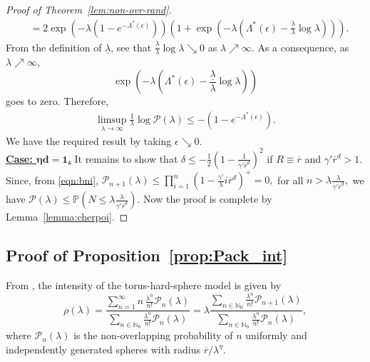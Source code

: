 \documentclass[11pt]{article}
\newcommand{\pp}{\mathbb{P}}
\newcommand{\rbdd}{\overline{r}}
\newcommand{\mbb}{\mathbb}
\newcommand{\lt}{\left}
\newcommand{\rt}{\right}
\newcommand{\pno}{\mathcal{P}(\lambda)}
\begin{document}
\begin{appendices}
\begin{proof}[Proof of Theorem~\ref{lem:non-ovr-rand}]
\begin{align*}
     &= 2\exp\lt(- \lambda\lt(1 - e^{-\Lambda^*(\epsilon)} \rt) \rt) \lt( 1 + \exp\lt(- \lambda\lt(\Lambda^*(\epsilon) - \frac{\underline{\lambda}}{\lambda} \log\lambda\rt)\rt)\rt).
\end{align*}
From the definition of $\underline{\lambda}$, see that $\frac{\underline{\lambda}}{\lambda} \log\lambda \searrow 0$ as $\lambda \nearrow \infty$. As a consequence, as $\lambda \nearrow \infty$, $$\exp\lt(- \lambda\lt(\Lambda^*(\epsilon) - \frac{\underline{\lambda}}{\lambda} \log\lambda\rt)\rt)$$ goes to zero.
Therefore,
\begin{align*}
\limsup_{\lambda \rightarrow \infty} \frac{1}{\lambda} \log \pno \leq -\lt(1 - e^{-\Lambda^*(\epsilon)} \rt).
\end{align*}
We have the required result by taking $\epsilon \searrow 0$.\\




{\bf \underline{Case: $\boldsymbol{\eta d  = 1}$.}}
{It remains} to show that $\delta \leq -\frac{1}{2}\lt(1 - \frac{1}{\gamma' \rbdd^d}\rt)^2$ if $R \equiv \rbdd$ and $\gamma' \rbdd^d > 1$.
Since, from \eqref{eqn:bni}, $\mathcal{P}_{n+1}(\lambda) \leq \prod_{i=1}^{n} \lt(1 - \frac{\gamma'}{\lambda} i \rbdd^d\rt)^+  = 0,$ for all $n > \lambda \frac{\lambda}{\gamma' \rbdd^d},$ we have $\pno \leq \pp \lt( N \leq \lambda \frac{\lambda}{\gamma' \rbdd^d}\rt).$ Now the proof is complete by Lemma~\ref{lemma:cherpoi}.
\end{proof}


\subsection{Proof of Proposition~\ref{prop:Pack_int}}
From \cite{MMSWD01}, the intensity of the torus-hard-sphere model is given by 
\[ 
\rho(\lambda) = \frac{\sum_{n = 1}^\infty n \, \frac{\lambda^n}{n!} \mathcal{P}_{n}(\lambda)}{\sum_{n \in \mbb{N}_0} \frac{\lambda^n}{n!} \mathcal{P}_{n}(\lambda)} = \lambda \frac{\sum_{n \in \mbb{N}_0} \frac{\lambda^n}{n!} \mathcal{P}_{n+1}(\lambda)}{\sum_{n \in \mbb{N}_0} \frac{\lambda^n}{n!} \mathcal{P}_{n}(\lambda)},
\]
where $\mathcal{P}_{n}(\lambda)$ is the non-overlapping probability of $n$ uniformly and independently generated spheres with radius $\rbdd/\lambda^\eta$.\\


\end{appendices}
\end{document}
